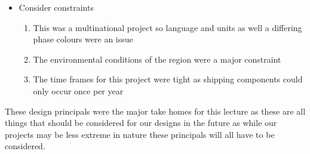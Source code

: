 \documentclass{article}
\begin{document}
\begin{itemize}
    \item{Consider constraints}
        \begin{enumerate}
            \item{This was a multinational project so language and units as well a differing phase
                colours were an issue}
            \item{The environmental conditions of the region were a major constraint}
            \item{The time frames for this project were tight as shipping components could only
                occur once per year}
        \end{enumerate}

\end{itemize}

These design principals were the major take homes for this lecture as these are all things that
should be considered for our designs in the future as while our projects may be less extreme in
nature these principals will all have to be considered.
\end{document}

